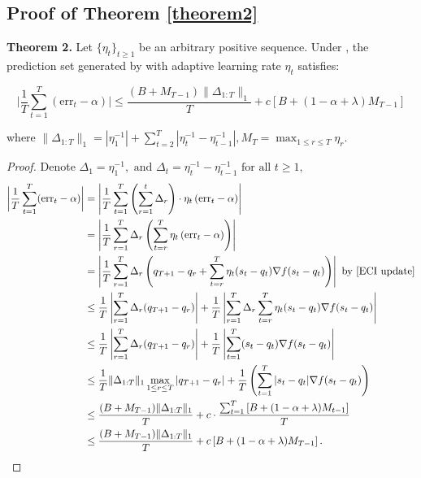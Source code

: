 \subsection{Proof of Theorem \ref{theorem2}}
\textbf{Theorem 2.}
  Let $\{\eta_t\}_{t \geq 1}$ be an arbitrary positive sequence. Under ,  the prediction set generated by  with adaptive learning rate $\eta_t$ satisfies:

\begin{equation}
    \bigg|\frac{1}{T} \sum_{t=1}^T (\text{err}_t-\alpha) \bigg|  \leq  \frac{(B+M_{T-1})\|\Delta_{1:T}\|_1}{T} +c \left[B+(1-\alpha+\lambda)M_{T-1}\right]
\end{equation}

where $\|\Delta_{1:T}\|_1=|\eta_1^{-1}|+\sum_{t=2}^T|\eta_t^{-1}-\eta_{t-1}^{-1}|, M_T = \max_{1\leq r \leq T}\eta_r$.

\begin{proof}
    Denote $\Delta_1=\eta_1^{-1},\text{ and }\Delta_t=\eta_t^{-1}-\eta_{t-1}^{-1}\text{ for all }t\geq1,$
\begin{align*}
\bigg|\frac{1}{T} \sum_{t=1}^T (\text{err}_t-\alpha) \bigg|
& =\left|\frac{1}{T} \sum_{t=1}^T\left(\sum_{r=1}^t \Delta_r\right) \cdot \eta_t\left(\text{err}_t-\alpha\right)\right| \\
& =\left|\frac{1}{T} \sum_{r=1}^T \Delta_r\left(\sum_{t=r}^T \eta_t\left(\text{err}_t-\alpha\right)\right)\right| \\
& =\left|\frac{1}{T} \sum_{r=1}^T \Delta_r\left(q_{T+1}-q_r+\sum_{t=r}^T \eta_t (s_t-q_t) \nabla f(s_t-q_t)\right)\right| \text { by \Cref{ECI update}} \\
& \leq \frac{1}{T}\left|\sum_{r=1}^T \Delta_r (q_{T+1}-q_r)\right|+\frac{1}{T} \left|\sum_{r=1}^T \Delta_r \sum_{t=r}^T \eta_t (s_t-q_t) \nabla f(s_t-q_t) \right| \\
& \leq \frac{1}{T}\left|\sum_{r=1}^T \Delta_r (q_{T+1}-q_r)\right|+\frac{1}{T} \left|\sum_{t=1}^T (s_t-q_t)\nabla f(s_t-q_t)\right|\\
& \leq \frac{1}{T} \|\Delta_{1:T}\|_1   \max _{1 \leq r \leq T}\left|q_{T+1}-q_r\right|+\frac{1}{T} \left(\sum_{t=1}^T |s_t-q_t|\nabla f(s_t-q_t)\right)\\
& \leq \frac{(B+M_{T-1})\|\Delta_{1:T}\|_1}{T} +c \cdot \frac{\sum_{t=1}^T \left[B+(1-\alpha+\lambda)M_{t-1}\right]}{T} \\
& \leq \frac{(B+M_{T-1})\|\Delta_{1:T}\|_1}{T} +c \left[B+(1-\alpha+\lambda)M_{T-1}\right].
\end{align*}
\end{proof}






